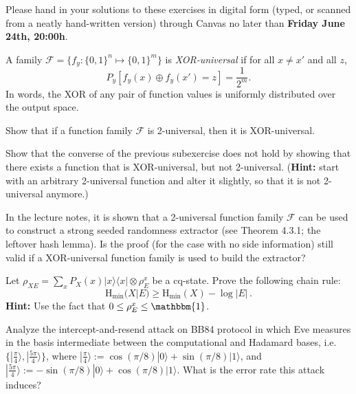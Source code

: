 \documentclass[a4paper,10pt,landscape,twocolumn]{scrartcl}
\newcommand{\ket}[1]{| #1 \rangle}
\newcommand{\bra}[1]{\langle #1 |}
\newcommand\deadline{Friday June 24th, 20:00h}
\begin{document}
\newcommand{\Hmin}{\mathrm{H}_{\mathrm{min}}}

\homeworkproblems

{\sffamily\noindent
Please hand in your solutions to these exercises in digital form (typed, or scanned from a neatly hand-written version) through Canvas no later than \textbf{\deadline}.  %
}


\begin{exercise}
A family $\mathscr{F} = \{f_y : \{0,1\}^n \mapsto \{0,1\}^m\}$ is \emph{XOR-universal} if for all $x \neq x'$ and all $z$,
\[
P_y[f_y(x) \oplus f_y(x') = z] = \frac{1}{2^m}.
\]
	In words, the XOR of any pair of function values is uniformly distributed over the output space.
	\begin{subex}
		Show that if a function family $\mathscr{F}$ is 2-universal, then it is XOR-universal.
	\end{subex}
    \begin{subex}
        Show that the converse of the previous subexercise does not hold by showing that there exists a function that is XOR-universal, but not 2-universal. (\textbf{Hint:} start with an arbitrary 2-universal function and alter it slightly, so that it is not 2-universal anymore.)
    \end{subex}
    \begin{subex}
    	In the lecture notes, it is shown that a 2-universal function family $\mathscr{F}$ can be used to construct a strong seeded randomness extractor (see Theorem 4.3.1; the leftover hash lemma). Is the proof (for the case with no side information) still valid if a XOR-universal function family is used to build the extractor?
    \end{subex}
\end{exercise}

\begin{exercise}
Let $\rho_{XE} = \sum_x P_X(x) \ket{x}\bra{x} \otimes \rho_E^x$ be a cq-state. Prove the following chain rule:
\[
\Hmin(X | E) \geq \Hmin(X) - \log |E| \, .
\]
\textbf{Hint: } Use the fact that $0 \leq \rho_E^x \leq \mathbbm{1}$.

\end{exercise}

\begin{exercise}
Analyze the intercept-and-resend attack on BB84 protocol in which Eve measures in the basis intermediate between the computational and Hadamard bases, i.e. $\{\ket{\frac{\pi}{4}},\ket{\frac{5\pi}{4}} \}$, where $\ket{\frac{\pi}{4}}:=\cos(\pi/8)\ket{0}+\sin(\pi/8)\ket{1}$, and $\ket{\frac{5\pi}{4}}:=-\sin(\pi/8)\ket{0}+\cos(\pi/8)\ket{1}$. What is the error rate this attack induces?
\end{exercise}
\end{document}

